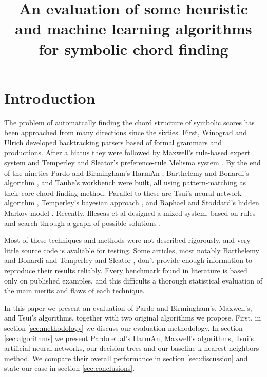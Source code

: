 \documentclass{article}
\title{An evaluation of some heuristic and machine learning algorithms for
  symbolic chord finding} \oneauthor {}{}
\begin{document}
\graphicspath{{figs/}{data/}}
\maketitle

\begin{abstract}



\end{abstract}

\section{Introduction}
\label{sec:introduction}


The problem of automatcally finding the chord structure of symbolic
scores has been approached from many directions since the
sixties. First, Winograd \cite{winograd:linguistics} and Ulrich
\cite{ulrich:analysis} developed backtracking parsers based of formal
grammars and productions. After a hiatus they were followed by
Maxwell's \cite{maxwell:expert} rule-based expert system and Temperley
and Sleator's preference-rule Melisma system
\cite{temperley.ea:modeling}. By the end of the nineties Pardo and
Birmingham's HarmAn \cite{pardo.ea:algorithms}, Barthelemy and
Bonardi's algorithm \cite{barthelemy.ea:figured}, and Taube's
workbench \cite{taube:automatic} were built, all using
pattern-matching as their core chord-finding method. Parallel to these
are Tsui's neural network algorithm \cite{tsui:harmonic}, Temperley's
bayesian approach \cite{temperley:bayesian}, and Raphael and
Stoddard's hidden Markov model \cite{raphael.ea:harmonic}. Recently,
Illescas et al designed a mixed system, based on rules and search
through a graph of possible solutions \cite{illescas.ea:harmonic}.

Most of these techniques and methods were not described rigorously,
and very little source code is avaliable for testing. Some articles,
most notably Barthelemy and Bonardi \cite{barthelemy.ea:figured} and
Temperley and Sleator \cite{temperley.ea:modeling}, don't provide
enough information to reproduce their results reliably. Every
benchmark found in literature \cite{pardo.ea:automated,
  barthelemy.ea:figured, tsui:harmonic, taube:automatic,
  illescas.ea:harmonic} is based only on published examples, and this
difficults a thorough statistical evaluation of the main merits and
flaws of each technique.

In this paper we present an evaluation of Pardo and Birmingham's,
Maxwell's, and Tsui's algorithms, together with two original
algorithms we propose.  First, in section \ref{sec:methodology} we
discuss our evaluation methodology. In section \ref{sec:algorithms} we
present Pardo et al's HarmAn, Maxwell's algorithms, Tsui's artificial
neural networks, our decision trees and our baseline
k-nearest-neighbors method. We compare their overall performance in
section \ref{sec:discussion} and state our case in section
\ref{sec:conclusions}.
\end{document}
